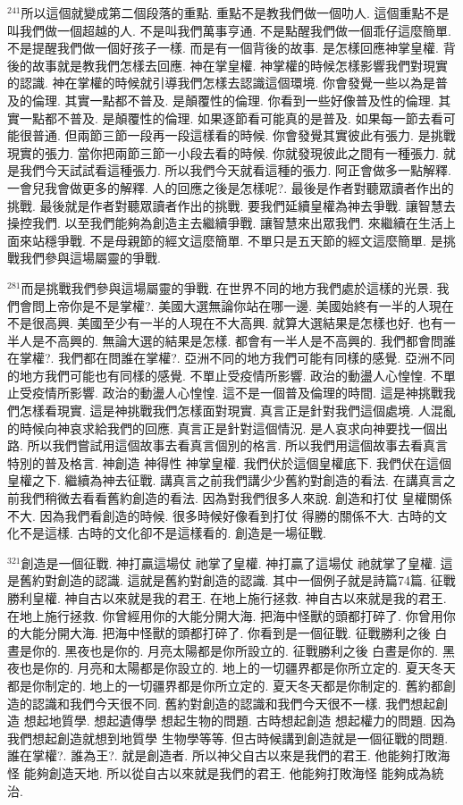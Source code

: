 \documentclass{book}
\begin{document}
$^{241}$所以這個就變成第二個段落的重點.
重點不是教我們做一個叻人.
這個重點不是叫我們做一個超越的人.
不是叫我們萬事亨通.
不是點醒我們做一個乖仔這麼簡單.
不是提醒我們做一個好孩子一樣.
而是有一個背後的故事.
是怎樣回應神掌皇權.
背後的故事就是教我們怎樣去回應.
神在掌皇權.
神掌權的時候怎樣影響我們對現實的認識.
神在掌權的時候就引導我們怎樣去認識這個環境.
你會發覺一些以為是普及的倫理.
其實一點都不普及.
是顛覆性的倫理.
你看到一些好像普及性的倫理.
其實一點都不普及.
是顛覆性的倫理.
如果逐節看可能真的是普及.
如果每一節去看可能很普通.
但兩節三節一段再一段這樣看的時候.
你會發覺其實彼此有張力.
是挑戰現實的張力.
當你把兩節三節一小段去看的時候.
你就發現彼此之間有一種張力.
就是我們今天試試看這種張力.
所以我們今天就看這種的張力.
阿正會做多一點解釋.
一會兒我會做更多的解釋.
人的回應之後是怎樣呢?.
最後是作者對聽眾讀者作出的挑戰.
最後就是作者對聽眾讀者作出的挑戰.
要我們延續皇權為神去爭戰.
讓智慧去操控我們.
以至我們能夠為創造主去繼續爭戰.
讓智慧來出眾我們.
來繼續在生活上面來站穩爭戰.
不是母親節的經文這麼簡單.
不單只是五天節的經文這麼簡單.
是挑戰我們參與這場屬靈的爭戰.

$^{281}$而是挑戰我們參與這場屬靈的爭戰.
在世界不同的地方我們處於這樣的光景.
我們會問上帝你是不是掌權?.
美國大選無論你站在哪一邊.
美國始終有一半的人現在不是很高興.
美國至少有一半的人現在不大高興.
就算大選結果是怎樣也好.
也有一半人是不高興的.
無論大選的結果是怎樣.
都會有一半人是不高興的.
我們都會問誰在掌權?.
我們都在問誰在掌權?.
亞洲不同的地方我們可能有同樣的感覺.
亞洲不同的地方我們可能也有同樣的感覺.
不單止受疫情所影響.
政治的動盪人心惶惶.
不單止受疫情所影響.
政治的動盪人心惶惶.
這不是一個普及倫理的時間.
這是神挑戰我們怎樣看現實.
這是神挑戰我們怎樣面對現實.
真言正是針對我們這個處境.
人混亂的時候向神哀求給我們的回應.
真言正是針對這個情況.
是人哀求向神要找一個出路.
所以我們嘗試用這個故事去看真言個別的格言.
所以我們用這個故事去看真言特別的普及格言.
神創造 神得性 神掌皇權.
我們伏於這個皇權底下.
我們伏在這個皇權之下.
繼續為神去征戰.
講真言之前我們講少少舊約對創造的看法.
在講真言之前我們稍微去看看舊約創造的看法.
因為對我們很多人來說.
創造和打仗 皇權關係不大.
因為我們看創造的時候.
很多時候好像看到打仗 得勝的關係不大.
古時的文化不是這樣.
古時的文化卻不是這樣看的.
創造是一場征戰.

$^{321}$創造是一個征戰.
神打贏這場仗 祂掌了皇權.
神打贏了這場仗 祂就掌了皇權.
這是舊約對創造的認識.
這就是舊約對創造的認識.
其中一個例子就是詩篇74篇.
征戰勝利皇權.
神自古以來就是我的君王.
在地上施行拯救.
神自古以來就是我的君王.
在地上施行拯救.
你曾經用你的大能分開大海.
把海中怪獸的頭都打碎了.
你曾用你的大能分開大海.
把海中怪獸的頭都打碎了.
你看到是一個征戰.
征戰勝利之後 白晝是你的.
黑夜也是你的.
月亮太陽都是你所設立的.
征戰勝利之後 白晝是你的.
黑夜也是你的.
月亮和太陽都是你設立的.
地上的一切疆界都是你所立定的.
夏天冬天都是你制定的.
地上的一切疆界都是你所立定的.
夏天冬天都是你制定的.
舊約都創造的認識和我們今天很不同.
舊約對創造的認識和我們今天很不一樣.
我們想起創造 想起地質學.
想起遺傳學 想起生物的問題.
古時想起創造 想起權力的問題.
因為我們想起創造就想到地質學 生物學等等.
但古時候講到創造就是一個征戰的問題.
誰在掌權?.
誰為王?.
就是創造者.
所以神父自古以來是我們的君王.
他能夠打敗海怪 能夠創造天地.
所以從自古以來就是我們的君王.
他能夠打敗海怪 能夠成為統治.
\end{document}
